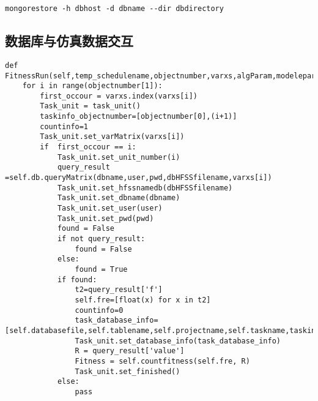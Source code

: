 
\begin{lstlisting}
mongorestore -h dbhost -d dbname --dir dbdirectory
\end{lstlisting}


\newpage

\subsection{数据库与仿真数据交互}





\begin{lstlisting}
def FitnessRun(self,temp_schedulename,objectnumber,varxs,algParam,modeleparam,param_configlist,ReflectService):
    for i in range(objectnumber[1]):
        first_occour = varxs.index(varxs[i])
        Task_unit = task_unit()
        taskinfo_objectnumber=[objectnumber[0],(i+1)]
        countinfo=1
        Task_unit.set_varMatrix(varxs[i])
        if  first_occour == i:
            Task_unit.set_unit_number(i)
            query_result =self.db.queryMatrix(dbname,user,pwd,dbHFSSfilename,varxs[i])
            Task_unit.set_hfssnamedb(dbHFSSfilename)
            Task_unit.set_dbname(dbname)
            Task_unit.set_user(user)
            Task_unit.set_pwd(pwd)
            found = False
            if not query_result:
                found = False
            else:
                found = True
            if found:
                t2=query_result['f']
                self.fre=[float(x) for x in t2]
                countinfo=0
                task_database_info=[self.databasefile,self.tablename,self.projectname,self.taskname,taskinfo_objectnumber,countinfo]
                Task_unit.set_database_info(task_database_info)
                R = query_result['value']
                Fitness = self.countfitness(self.fre, R)
                Task_unit.set_finished()
            else:
                pass
\end{lstlisting}

